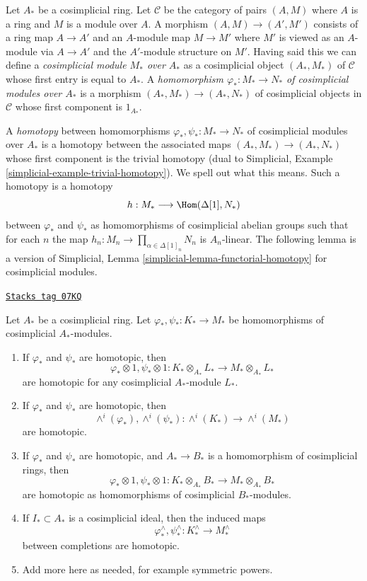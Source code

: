 \medskip\noindent
Let $A_*$ be a cosimplicial ring. Let $\mathcal{C}$ be the category
of pairs $(A, M)$ where $A$ is a ring and $M$ is a module over $A$.
A morphism $(A, M) \to (A', M')$ consists of a ring map $A \to A'$ and
an $A$-module map $M \to M'$ where $M'$ is viewed as an $A$-module
via $A \to A'$ and the $A'$-module structure on $M'$. Having said this
we can define a {\it cosimplicial module $M_*$ over $A_*$} as a cosimplicial
object $(A_*, M_*)$ of $\mathcal{C}$ whose first entry is equal to $A_*$.
A {\it homomorphism $\varphi_* : M_* \to N_*$ of cosimplicial modules over
$A_*$} is a morphism $(A_*, M_*) \to (A_*, N_*)$ of cosimplicial objects
in $\mathcal{C}$ whose first component is $1_{A_*}$.

\medskip\noindent
A {\it homotopy} between homomorphisms $\varphi_*, \psi_* : M_* \to N_*$
of cosimplicial modules over $A_*$ is a homotopy between the associated
maps $(A_*, M_*) \to (A_*, N_*)$ whose first component is the
trivial homotopy (dual to
Simplicial, Example \ref{simplicial-example-trivial-homotopy}).
We spell out what this means. Such a homotopy is a homotopy
$$
h : M_* \longrightarrow \Hom(\Delta[1], N_*)
$$
between $\varphi_*$ and $\psi_*$ as homomorphisms of cosimplicial abelian
groups such that for each $n$ the map
$h_n : M_n \to \prod_{\alpha \in \Delta[1]_n} N_n$ is $A_n$-linear.
The following lemma is a version of
Simplicial, Lemma \ref{simplicial-lemma-functorial-homotopy}
for cosimplicial modules.

\begin{lemma}
\label{crystalline-lemma-homotopy-tensor}
\href{https://stacks.math.columbia.edu/tag/07KQ}{\texttt{Stacks tag 07KQ}}

Let $A_*$ be a cosimplicial ring. Let $\varphi_*, \psi_* : K_* \to M_*$
be homomorphisms of cosimplicial $A_*$-modules.
\begin{enumerate}
\item
\label{crystalline-item-tensor}
If $\varphi_*$ and $\psi_*$ are homotopic, then
$$
\varphi_* \otimes 1, \psi_* \otimes 1 :
K_* \otimes_{A_*} L_* \longrightarrow M_* \otimes_{A_*} L_*
$$
are homotopic for any cosimplicial $A_*$-module $L_*$.
\item
\label{crystalline-item-wedge}
If $\varphi_*$ and $\psi_*$ are homotopic, then
$$
\wedge^i(\varphi_*), \wedge^i(\psi_*) :
\wedge^i(K_*) \longrightarrow \wedge^i(M_*)
$$
are homotopic.
\item
\label{crystalline-item-base-change}
If $\varphi_*$ and $\psi_*$ are homotopic, and $A_* \to B_*$
is a homomorphism of cosimplicial rings, then
$$
\varphi_* \otimes 1, \psi_* \otimes 1 :
K_* \otimes_{A_*} B_* \longrightarrow M_* \otimes_{A_*} B_*
$$
are homotopic as homomorphisms of cosimplicial $B_*$-modules.
\item
\label{crystalline-item-completion}
If $I_* \subset A_*$ is a cosimplicial ideal, then the induced
maps
$$
\varphi^\wedge_*, \psi^\wedge_* :
K_*^\wedge \longrightarrow M_*^\wedge
$$
between completions are homotopic.
\item Add more here as needed, for example symmetric powers.
\end{enumerate}
\end{lemma}

